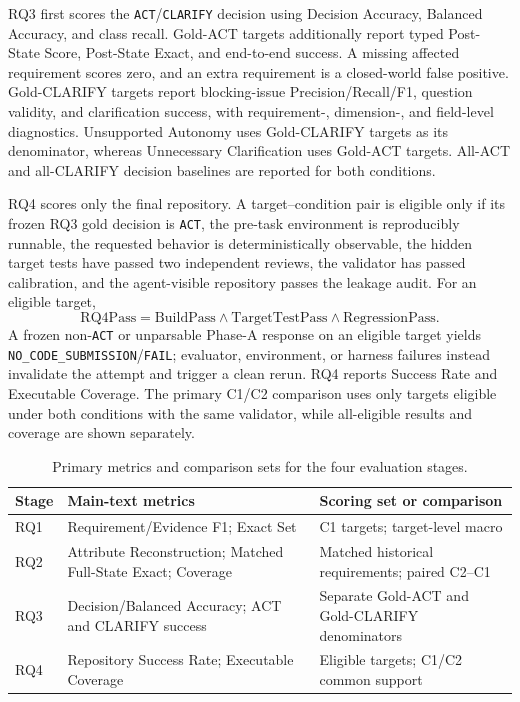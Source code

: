 \documentclass{article} %
\begin{document}
RQ3 first scores the \texttt{ACT}/\texttt{CLARIFY} decision using Decision Accuracy, Balanced Accuracy, and class recall. Gold-ACT targets additionally report typed Post-State Score, Post-State Exact, and end-to-end success. A missing affected requirement scores zero, and an extra requirement is a closed-world false positive. Gold-CLARIFY targets report blocking-issue Precision/Recall/F1, question validity, and clarification success, with requirement-, dimension-, and field-level diagnostics. Unsupported Autonomy uses Gold-CLARIFY targets as its denominator, whereas Unnecessary Clarification uses Gold-ACT targets. All-ACT and all-CLARIFY decision baselines are reported for both conditions.

RQ4 scores only the final repository. A target--condition pair is eligible only if its frozen RQ3 gold decision is \texttt{ACT}, the pre-task environment is reproducibly runnable, the requested behavior is deterministically observable, the hidden target tests have passed two independent reviews, the validator has passed calibration, and the agent-visible repository passes the leakage audit. For an eligible target,
\[
\mathrm{RQ4Pass}
=
\mathrm{BuildPass}\land
\mathrm{TargetTestPass}\land
\mathrm{RegressionPass}.
\]
A frozen non-\texttt{ACT} or unparsable Phase-A response on an eligible target yields \texttt{NO\_CODE\_SUBMISSION}/\texttt{FAIL}; evaluator, environment, or harness failures instead invalidate the attempt and trigger a clean rerun. RQ4 reports Success Rate and Executable Coverage. The primary C1/C2 comparison uses only targets eligible under both conditions with the same validator, while all-eligible results and coverage are shown separately.

\begin{table}[t]
\caption{Primary metrics and comparison sets for the four evaluation stages.}
\label{tab:primary-metrics}
\centering
\small
\begin{tabular}{@{}lp{1.95in}p{2.20in}@{}}
\toprule
Stage & Main-text metrics & Scoring set or comparison \\
\midrule
RQ1 & Requirement/Evidence F1; Exact Set & C1 targets; target-level macro \\
RQ2 & Attribute Reconstruction; Matched Full-State Exact; Coverage & Matched historical requirements; paired C2--C1 \\
RQ3 & Decision/Balanced Accuracy; ACT and CLARIFY success & Separate Gold-ACT and Gold-CLARIFY denominators \\
RQ4 & Repository Success Rate; Executable Coverage & Eligible targets; C1/C2 common support \\
\bottomrule
\end{tabular}
\end{table}
\end{document}
